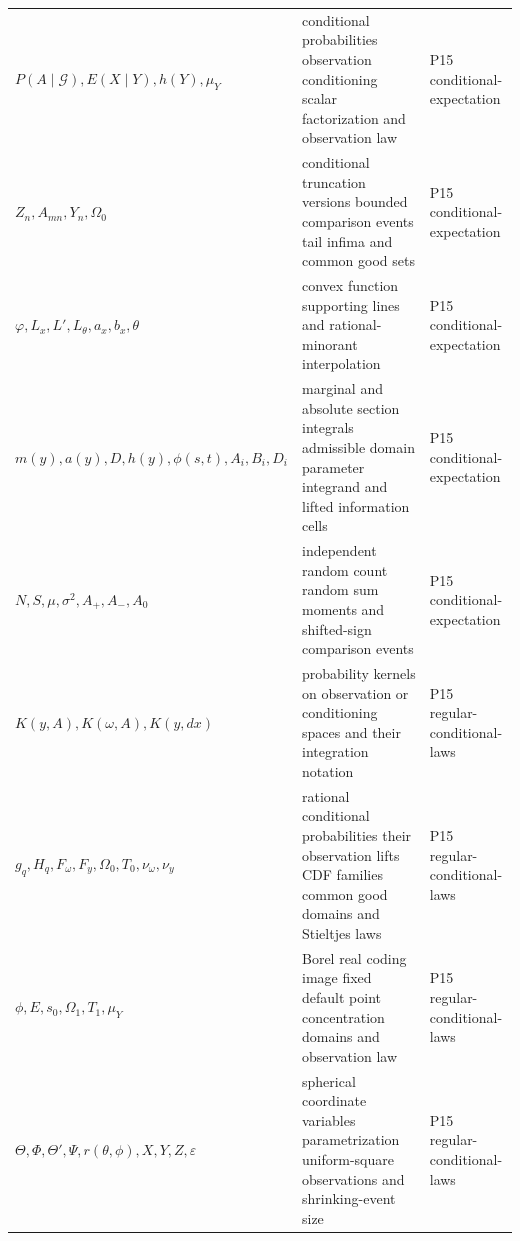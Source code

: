 \begin{longtable}{@{}p{}p{}p{}@{}}
\(P(A\mid\mathcal G),\allowbreak E(X\mid Y),\allowbreak h(Y),\allowbreak \mu_Y\) & conditional probabilities observation conditioning scalar factorization and observation law & P15 conditional-\allowbreak{}expectation \\
\(Z_n,\allowbreak A_{mn},\allowbreak Y_n,\allowbreak \Omega_0\) & conditional truncation versions bounded comparison events tail infima and common good sets & P15 conditional-\allowbreak{}expectation \\
\(\varphi,\allowbreak L_x,\allowbreak L',\allowbreak L_\theta,\allowbreak a_x,\allowbreak b_x,\allowbreak \theta\) & convex function supporting lines and rational-minorant interpolation & P15 conditional-\allowbreak{}expectation \\
\(m(y),\allowbreak a(y),\allowbreak D,\allowbreak h(y),\allowbreak \phi(s,\allowbreak t),\allowbreak A_i,\allowbreak B_i,\allowbreak D_i\) & marginal and absolute section integrals admissible domain parameter integrand and lifted information cells & P15 conditional-\allowbreak{}expectation \\
\(N,\allowbreak S,\allowbreak \mu,\allowbreak \sigma^2,\allowbreak A_+,\allowbreak A_-,\allowbreak A_0\) & independent random count random sum moments and shifted-sign comparison events & P15 conditional-\allowbreak{}expectation \\
\(K(y,\allowbreak A),\allowbreak K(\omega,\allowbreak A),\allowbreak K(y,\allowbreak dx)\) & probability kernels on observation or conditioning spaces and their integration notation & P15 regular-\allowbreak{}conditional-\allowbreak{}laws \\
\(g_q,\allowbreak H_q,\allowbreak F_\omega,\allowbreak F_y,\allowbreak \Omega_0,\allowbreak T_0,\allowbreak \nu_\omega,\allowbreak \nu_y\) & rational conditional probabilities their observation lifts CDF families common good domains and Stieltjes laws & P15 regular-\allowbreak{}conditional-\allowbreak{}laws \\
\(\phi,\allowbreak E,\allowbreak s_0,\allowbreak \Omega_1,\allowbreak T_1,\allowbreak \mu_Y\) & Borel real coding image fixed default point concentration domains and observation law & P15 regular-\allowbreak{}conditional-\allowbreak{}laws \\
\(\Theta,\allowbreak \Phi,\allowbreak \Theta',\allowbreak \Psi,\allowbreak r(\theta,\allowbreak \phi),\allowbreak X,\allowbreak Y,\allowbreak Z,\allowbreak \varepsilon\) & spherical coordinate variables parametrization uniform-square observations and shrinking-event size & P15 regular-\allowbreak{}conditional-\allowbreak{}laws \\

\end{longtable}
